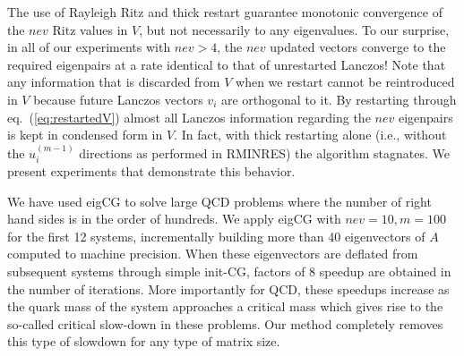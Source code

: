 \documentclass{report}
\begin{document}
The use of Rayleigh Ritz and thick restart guarantee monotonic
convergence of the $nev$ Ritz values in $V$,
but not necessarily to any eigenvalues.
To our surprise, in all of our experiments with $nev>4$, the $nev$ updated
vectors converge to the required eigenpairs at a rate identical to that of
unrestarted Lanczos!
Note that any information that is discarded from $V$ when we restart cannot
be reintroduced in $V$ because future Lanczos vectors $v_i$ are
orthogonal to it.
By restarting through eq.~(\ref{eq:restartedV}) almost all Lanczos
information regarding the $nev$ eigenpairs is kept in condensed form in $V$.
In fact, with thick restarting alone (i.e., without the $u_i^{(m-1)}$
directions as performed in RMINRES) the algorithm stagnates.
We present experiments that demonstrate this behavior.

We have used eigCG to solve large QCD problems where
the number of right hand sides is in the order of hundreds.
We apply eigCG with $nev=10, m=100$ for the first 12 systems, incrementally
building more than 40 eigenvectors of $A$ computed to machine precision.
When these eigenvectors are deflated from subsequent systems
through simple init-CG, factors of 8 speedup are obtained in the
number of iterations.
More importantly for QCD, these speedups increase as the quark mass of
the system approaches a critical mass which gives rise to the so-called
critical slow-down in these problems.
Our method completely removes this type of slowdown for any type of matrix
size.
\end{document}
